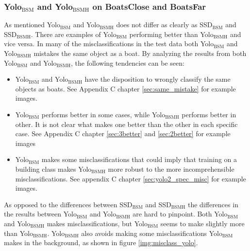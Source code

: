 \subsubsection{Yolo$_{\text{BSM}}$ and Yolo$_{\text{BSMH}}$ on BoatsClose and BoatsFar}

As mentioned Yolo$_{\text{BSM}}$ and Yolo$_{\text{BSMH}}$ does not differ as clearly as SSD$_{\text{BSM}}$ and SSD$_{\text{BSMH}}$. There are examples of Yolo$_{\text{BSM}}$ performing better than Yolo$_{\text{BSMH}}$ and vice versa. In many of the misclassifications in the test data both Yolo$_{\text{BSM}}$ and Yolo$_{\text{BSMH}}$ mistakes the same object as a boat. By analyzing the results from both Yolo$_{\text{BSM}}$ and Yolo$_{\text{BSMH}}$, the following tendencies can be seen:

\begin{itemize}
    \item Yolo$_{\text{BSM}}$ and Yolo$_{\text{BSMH}}$ have the disposition to wrongly classify the same objects as boats. See Appendix C chapter \ref{sec:same_mistake} for example images.
    \item Yolo$_{\text{BSM}}$ performs better in some cases, while Yolo$_{\text{BSMH}}$ performs better in other. It is not clear what makes one better than the other in each specific case. See Appendix C chapter \ref{sec:3better} and \ref{sec:2better} for example images
    \item Yolo$_{\text{BSM}}$ makes some misclassifications that could imply that training on a building class makes Yolo$_{\text{BSMH}}$ more robust to the more incomprehensible misclassifications. See appendix C chapter \ref{sec:yolo2_spec_misc} for example images.
\end{itemize}

As opposed to the differences between SSD$_{\text{BSM}}$ and SSD$_{\text{BSMH}}$ the differences in the results between Yolo$_{\text{BSM}}$ and Yolo$_{\text{BSMH}}$ are hard to pinpoint. Both Yolo$_{\text{BSM}}$ and Yolo$_{\text{BSMH}}$ makes misclassifications, but Yolo$_{\text{BSM}}$ seems to make slightly more than Yolo$_{\text{BSMH}}$. Yolo$_{\text{BSMH}}$ also avoids making some misclassifications Yolo$_{\text{BSM}}$ makes in the background, as shown in figure \ref{img:misclass_yolo}.

